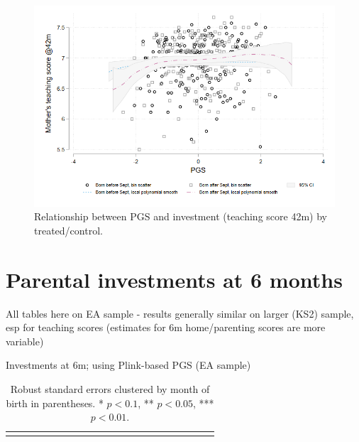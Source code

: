 \documentclass{article}
\begin{document}
\begin{figure}[H]
\centering 
\includegraphics[width=1\linewidth]{../figures/PGSxTreat_teach42m.png}
\caption{Relationship between PGS and investment (teaching score 42m) by treated/control.}
\label{fig:PGSxTreat_teach42m}
\end{figure}



\section{Parental investments at 6 months}
All tables here on EA sample - results generally similar on larger (KS2) sample, esp for teaching scores (estimates for 6m home/parenting scores are more variable)

\begin{table}[H]
\caption{Investments at 6m; using Plink-based PGS (EA sample)}
\centering
{\scriptsize
\begin{tabular}{lcccccccccccccccccccc}
\toprule

\bottomrule
\addlinespace[.75ex]
\end{tabular}
}
\caption*{\noindent\scriptsize Robust standard errors clustered by month of birth in parentheses. * $p < 0.1$, ** $p < 0.05$, *** $p < 0.01$.}
\end{table}

%
\end{document}
